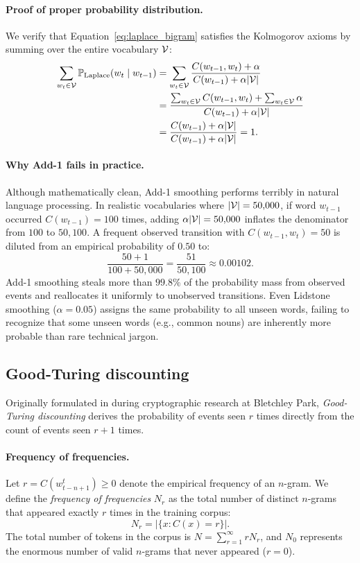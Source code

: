 \documentclass[../../main.tex]{subfiles}
\begin{document}
\paragraph{Proof of proper probability distribution.}
We verify that Equation~\eqref{eq:laplace_bigram} satisfies the Kolmogorov axioms by summing over the entire vocabulary $\mathcal{V}$:
\begin{align}
\sum_{w_t \in \mathcal{V}} \mathbb{P}_{\text{Laplace}}(w_t \mid w_{t-1}) &= \sum_{w_t \in \mathcal{V}} \frac{C(w_{t-1}, w_t) + \alpha}{C(w_{t-1}) + \alpha |\mathcal{V}|} \notag \\
&= \frac{\sum_{w_t \in \mathcal{V}} C(w_{t-1}, w_t) + \sum_{w_t \in \mathcal{V}} \alpha}{C(w_{t-1}) + \alpha |\mathcal{V}|} \notag \\
&= \frac{C(w_{t-1}) + \alpha |\mathcal{V}|}{C(w_{t-1}) + \alpha |\mathcal{V}|} = 1. \label{eq:laplace_proof}
\end{align}

\paragraph{Why Add-1 fails in practice.}
Although mathematically clean, Add-1 smoothing performs terribly in natural language processing. In realistic vocabularies where $|\mathcal{V}| = 50{,}000$, if word $w_{t-1}$ occurred $C(w_{t-1}) = 100$ times, adding $\alpha |\mathcal{V}| = 50{,}000$ inflates the denominator from $100$ to $50{,}100$. A frequent observed transition with $C(w_{t-1}, w_t) = 50$ is diluted from an empirical probability of $0.50$ to:
\[
\frac{50 + 1}{100 + 50{,}000} = \frac{51}{50{,}100} \approx 0.00102.
\]
Add-1 smoothing steals more than $99.8\%$ of the probability mass from observed events and reallocates it uniformly to unobserved transitions. Even Lidstone smoothing ($\alpha = 0.05$) assigns the same probability to all unseen words, failing to recognize that some unseen words (e.g., common nouns) are inherently more probable than rare technical jargon.

\subsection{Good-Turing discounting}
Originally formulated in \cite{good1953} during cryptographic research at Bletchley Park, \emph{Good-Turing discounting} derives the probability of events seen $r$ times directly from the count of events seen $r+1$ times.

\paragraph{Frequency of frequencies.}
Let $r = C(w_{t-n+1}^t) \ge 0$ denote the empirical frequency of an $n$-gram. We define the \emph{frequency of frequencies} $N_r$ as the total number of distinct $n$-grams that appeared exactly $r$ times in the training corpus:
\begin{equation}
\label{eq:gt_nr}
N_r = \left| \{ x : C(x) = r \} \right|.
\end{equation}
The total number of tokens in the corpus is $N = \sum_{r=1}^\infty r N_r$, and $N_0$ represents the enormous number of valid $n$-grams that never appeared ($r=0$).
\end{document}
